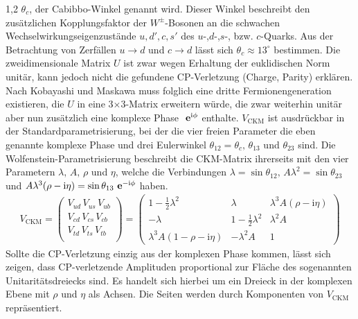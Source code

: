 \documentclass[11pt,a4paper,twoside,draft]{report}
\begin{document}
\begin{spacing}{1,2}
$\theta_c$, der Cabibbo-Winkel genannt wird. Dieser Winkel beschreibt den zusätzlichen Kopplungsfaktor der $W^\pm$-Bosonen an die schwachen 
Wechselwirkungseigenzustände $u, d', c, s'$ des $u$-,$d$-,$s$-, bzw. $c$-Quarks. Aus der Betrachtung von Zerfällen $u\rightarrow d$ und $c\rightarrow d$ lässt
sich $\theta_c \approx 13^\circ$ bestimmen. Die zweidimensionale Matrix $U$ ist zwar wegen Erhaltung der euklidischen Norm unitär, kann jedoch nicht die 
gefundene CP-Verletzung (Charge, Parity) erklären. Nach Kobayashi und Maskawa muss folglich eine dritte Fermionengeneration existieren,
die $U$ in eine 3$\times$3-Matrix erweitern würde, die zwar weiterhin unitär aber nun zusätzlich eine komplexe Phase $\ \mathbf{e}^{\text{i}\phi}$ enthalte. $V_{\text{CKM}}$ ist
ausdrückbar in der Standardparametrisierung, bei der die vier freien Parameter die eben genannte komplexe Phase und drei Eulerwinkel 
$\theta_{12} = \theta_c,\, \theta_{13}$ und $\theta_{23}$ sind. Die Wolfenstein-Parametrisierung beschreibt die CKM-Matrix ihrerseits mit den vier Parametern
$\lambda,\, A,\, \rho$ und $\eta$, welche die Verbindungen $\lambda = \sin\theta_{12},\, A\lambda^2 = \sin\theta_{23}$ und $A\lambda^3(\rho-\text{i}\eta) = \sin\theta_{13}\ \mathbf{e}^{-\text{i}\phi}$
haben.
\begin{align}
 V_{\text{CKM}} = \begin{pmatrix}
            V_{ud}\,V_{us}\,V_{ub}\\
            V_{cd}\,V_{cs}\,V_{cb}\\
            V_{td}\,V_{ts}\,V_{tb}\\
           \end{pmatrix} = \begin{pmatrix}
			    1-\frac12\lambda^2 & \lambda & \lambda^3A(\rho-\text{i}\eta)\\
			    -\lambda & 1-\frac12 \lambda^2 &\lambda^2A\\
			    \lambda^3A(1-\rho-\text{i}\eta) &-\lambda^2A & 1
			    \end{pmatrix}
\end{align}
Sollte die CP-Verletzung einzig aus der komplexen Phase kommen, lässt sich zeigen, dass CP-verletzende Amplituden proportional zur Fläche des sogenannten
Unitaritätsdreiecks sind. Es handelt sich hierbei um ein Dreieck in der komplexen Ebene mit $\rho$ und $\eta$ als Achsen. Die Seiten werden durch Komponenten
von $V_{\text{CKM}}$ repräsentiert.


\end{spacing}
\end{document}
